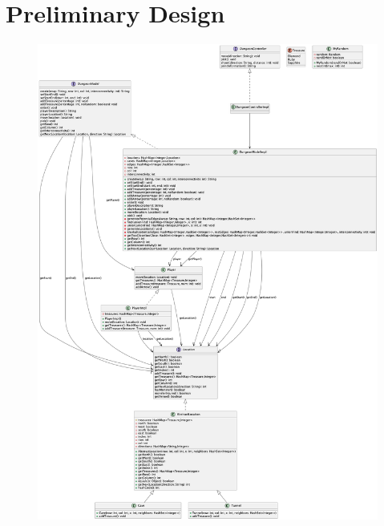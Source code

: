 \documentclass[12pt]{amsart}
\title{}
\author{}
\date{} %
\begin{document}
\section{Preliminary Design}

\begin{figure}[H] %
\centering %
\includegraphics[width=1\textwidth]{uml.png} %
\end{figure}

\newpage
\end{document}
